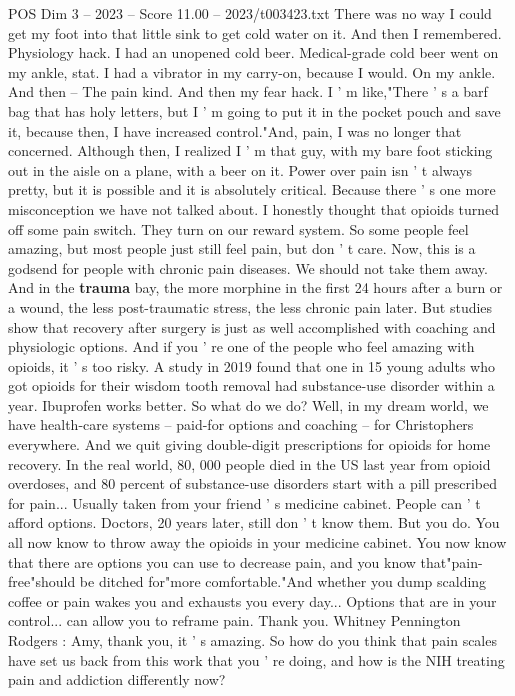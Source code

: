 \begin{textsample}{POS Dim 3 – 2023 – Score 11.00 – 2023/t003423.txt}
There was no way I could get my foot into that little sink to get cold water on it.
And then I remembered.
Physiology hack.
I had an unopened cold beer.
Medical-grade cold beer went on my ankle, stat.
I had a vibrator in my carry-on, because I would.
On my ankle.
And then -- The pain kind.
And then my fear hack.
I ' m like,"There ' s a barf bag that has holy letters, but I ' m going to put it in the pocket pouch and save it, because then, I have increased control."And, pain, I was no longer that concerned.
Although then, I realized I ' m that guy, with my bare foot sticking out in the aisle on a plane, with a beer on it.
Power over pain isn ' t always pretty, but it is possible and it is absolutely critical.
Because there ' s one more misconception we have not talked about.
I honestly thought that opioids turned off some pain switch.
They turn on our reward system.
So some people feel amazing, but most people just still feel pain, but don ' t care.
Now, this is a godsend for people with chronic pain diseases.
We should not take them away.
And in the \textbf{trauma} bay, the more morphine in the first 24 hours after a burn or a wound, the less post-traumatic stress, the less chronic pain later.
But studies show that recovery after surgery is just as well accomplished with coaching and physiologic options.
And if you ' re one of the people who feel amazing with opioids, it ' s too risky.
A study in 2019 found that one in 15 young adults who got opioids for their wisdom tooth removal had substance-use disorder within a year.
Ibuprofen works better.
So what do we do?
Well, in my dream world, we have health-care systems -- paid-for options and coaching -- for Christophers everywhere.
And we quit giving double-digit prescriptions for opioids for home recovery.
In the real world, 80, 000 people died in the US last year from opioid overdoses, and 80 percent of substance-use disorders start with a pill prescribed for pain...
Usually taken from your friend ' s medicine cabinet.
People can ' t afford options.
Doctors, 20 years later, still don ' t know them.
But you do.
You all now know to throw away the opioids in your medicine cabinet.
You now know that there are options you can use to decrease pain, and you know that"pain-free"should be ditched for"more comfortable."And whether you dump scalding coffee or pain wakes you and exhausts you every day...
Options that are in your control... can allow you to reframe pain.
Thank you.
Whitney Pennington Rodgers : Amy, thank you, it ' s amazing.
So how do you think that pain scales have set us back from this work that you ' re doing, and how is the NIH treating pain and addiction differently now?

\end{textsample}
